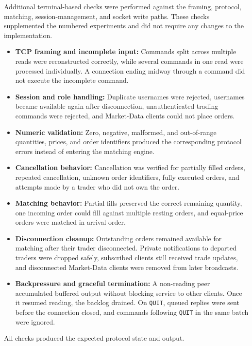 \documentclass[
]{article}
\providecommand{\tightlist}{%
  \setlength{\itemsep}{0pt}\setlength{\parskip}{0pt}}
\begin{document}
Additional terminal-based checks were performed against the framing,
protocol, matching, session-management, and socket write paths. These
checks supplemented the numbered experiments and did not require any
changes to the implementation.

\begin{itemize}
\tightlist
\item
  \textbf{TCP framing and incomplete input:} Commands split across
  multiple reads were reconstructed correctly, while several commands in
  one read were processed individually. A connection ending midway
  through a command did not execute the incomplete command.
\item
  \textbf{Session and role handling:} Duplicate usernames were rejected,
  usernames became available again after disconnection, unauthenticated
  trading commands were rejected, and Market-Data clients could not place
  orders.
\item
  \textbf{Numeric validation:} Zero, negative, malformed, and out-of-range
  quantities, prices, and order identifiers produced the corresponding
  protocol errors instead of entering the matching engine.
\item
  \textbf{Cancellation behavior:} Cancellation was verified for partially
  filled orders, repeated cancellation, unknown order identifiers, fully
  executed orders, and attempts made by a trader who did not own the
  order.
\item
  \textbf{Matching behavior:} Partial fills preserved the correct
  remaining quantity, one incoming order could fill against multiple
  resting orders, and equal-price orders were matched in arrival order.
\item
  \textbf{Disconnection cleanup:} Outstanding orders remained available
  for matching after their trader disconnected. Private notifications to
  departed traders were dropped safely, subscribed clients still received
  trade updates, and disconnected Market-Data clients were removed from
  later broadcasts.
\item
  \textbf{Backpressure and graceful termination:} A non-reading peer
  accumulated buffered output without blocking service to other clients.
  Once it resumed reading, the backlog drained. On \texttt{QUIT}, queued
  replies were sent before the connection closed, and commands following
  \texttt{QUIT} in the same batch were ignored.
\end{itemize}

All checks produced the expected protocol state and output.
\end{document}
